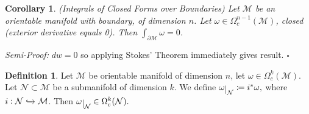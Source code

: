 \documentclass[10pt]{article}
\theoremstyle{plain}
\newtheorem{corollary}[thm]{Corollary}
\theoremstyle{definition}
\newtheorem{defn}[thm]{Definition} %
\newenvironment{semiproof}{\textit{Semi-Proof:}}{\hfill$\square$}
\newcommand{\man}{\mathcal{M}}
\newcommand{\nan}{\mathcal{N}}
\newcommand{\compactpformman}[1]{\Omega^{#1}_c(\man)}
\newcommand{\compactpformnan}[1]{\Omega^{#1}_c(\nan)}
\def\restrict#1{\raise-.5ex\hbox{\ensuremath|}_{#1}}
\begin{document}
\begin{corollary}{(Integrals of Closed Forms over Boundaries)} Let $\man$ be an orientable manifold with boundary, of dimension $n$. Let $\omega \in \compactpformman{n-1}$, closed (exterior derivative equals 0). Then $\int_{\partial\man}\omega = 0$.
\end{corollary}\noindent
\begin{semiproof}
$dw = 0 $ so applying Stokes' Theorem immediately gives result.
\end{semiproof}
\begin{defn}
Let $\man$ be orientable manifold of dimension $n$, let $\omega \in \compactpformman{k}$. Let $\nan \subset \man $ be a submanifold of dimension $k$. We define $\omega\restrict{\nan} \coloneqq i^* \omega,$ where $i:\nan\xhookrightarrow{}\man$. Then $\omega\restrict{\nan} \in \compactpformnan{k}.$
\end{defn}
\end{document}
